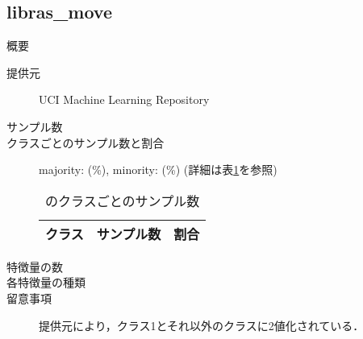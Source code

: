 \subsection{libras\_move}
\begin{description}
    \item[概要] \cite{}
    \item[提供元] UCI Machine Learning Repository
    \item[サンプル数] 
    \item[クラスごとのサンプル数と割合] majority:  (\%), minority:  (\%) (詳細は表\ref{tab:}を参照)

        \begin{table}
            \centering
            \caption{のクラスごとのサンプル数}
            \label{tab:}
            \begin{tabular}{lrc} \hline
                \multicolumn{1}{c}{クラス}&
                \multicolumn{1}{c}{サンプル数}&
                \multicolumn{1}{c}{割合}\\
                \hline
                \hline

                \hline
            \end{tabular}
        \end{table}

    \item[特徴量の数] 
    \item[各特徴量の種類] \mbox{}
        
    \item[留意事項] 提供元により，クラス1とそれ以外のクラスに2値化されている．
\end{description}

